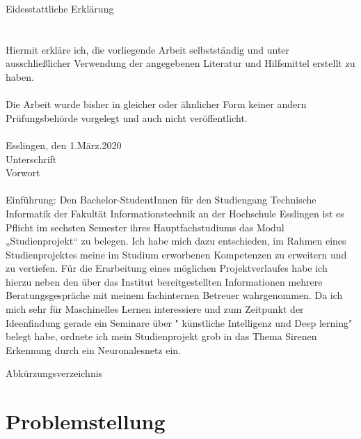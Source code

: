 \documentclass[a4paper,11pt]{article}
\theoremstyle{mytheor}
\begin{document}
\vspace*{150px}
\noindent\huge{Eidesstattliche Erklärung}\\\\
\large{\\
Hiermit erkläre ich, die vorliegende Arbeit selbstständig und unter ausschließlicher Verwendung der angegebenen Literatur und Hilfsmittel erstellt zu haben.\\\\
Die Arbeit wurde bisher in gleicher oder ähnlicher Form keiner andern Prüfungsbehörde vorgelegt und auch nicht veröffentlicht.\\
\\Esslingen, den 1.März.2020 \hspace{2.5cm}{\_\_\_\_\_\_\_\_\_\_\_\_\_\_\_\_\_}
\\\hspace*{9.3cm}Unterschrift\\}
\vspace*{250px}
\newpage
\vspace*{150px}
\noindent\huge{Vorwort}\\\\
\large{Einführung: Den Bachelor-StudentInnen  für den Studiengang Technische Informatik der Fakultät Informationstechnik an der Hochschule Esslingen  ist es Pflicht  im sechsten Semester ihres Hauptfachstudiums das Modul „Studienprojekt“  zu belegen. Ich habe mich  dazu  entschieden,  im  Rahmen  eines  Studienprojektes  meine  im  Studium  erworbenen Kompetenzen   zu   erweitern   und   zu   vertiefen.   Für   die Erarbeitung   eines   möglichen Projektverlaufes  habe  ich  hierzu  neben  den  über  das  Institut  bereitgestellten  Informationen mehrere  Beratungsgespräche  mit  meinem  fachinternen Betreuer  wahrgenommen.  Da  ich mich  sehr  für  Maschinelles Lernen  interessiere und zum Zeitpunkt der Ideenfindung gerade ein Seminare über " künstliche Intelligenz und Deep lerning" \space belegt habe, ordnete  ich  mein  Studienprojekt  grob  in  das  Thema  Sirenen Erkennung durch ein Neuronalesnetz ein. }
\newpage
\tableofcontents
\newpage
{}

\listoffigures
\newpage
{}
\noindent\huge{Abkürzungsverzeichnis}
\\ \large
\begin{acronym}[Bash]
\end{acronym}
\section{Problemstellung}
\end{document}
